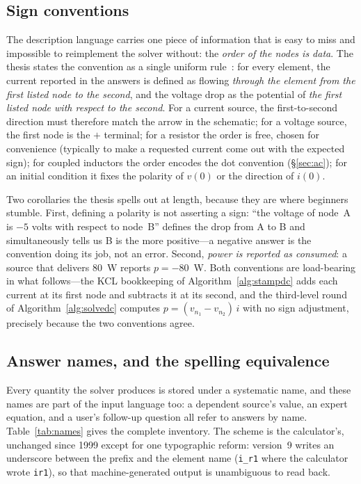 \documentclass[11pt,oneside]{report}
\newcommand{\code}[1]{\texttt{#1}}
\begin{document}
\subsection{Sign conventions}
\label{sec:signs}

The description language carries one piece of information that is
easy to miss and impossible to reimplement the solver without: the
\emph{order of the nodes is data}. The thesis states the convention
as a single uniform rule~\cite[\S2.11.1]{thesis2000}: for every
element, the current reported in the answers is defined as flowing
\emph{through the element from the first listed node to the second},
and the voltage drop as the potential of \emph{the first listed node
with respect to the second}. For a current source, the first-to-second
direction must therefore match the arrow in the schematic; for a
voltage source, the first node is the $+$ terminal; for a resistor
the order is free, chosen for convenience (typically to make a
requested current come out with the expected sign); for coupled
inductors the order encodes the dot convention (\S\ref{sec:ac}); for
an initial condition it fixes the polarity of $v(0)$ or the direction
of $i(0)$.

Two corollaries the thesis spells out at length, because they are
where beginners stumble. First, defining a polarity is not asserting
a sign: ``the voltage of node~A is $-5$ volts with respect to
node~B'' defines the drop from A to B and simultaneously tells us B
is the more positive---a negative answer is the convention doing its
job, not an error. Second, \emph{power is reported as consumed}: a
source that delivers 80~W reports $p = -80$~W. Both conventions are
load-bearing in what follows---the KCL bookkeeping of
Algorithm~\ref{alg:stampdc} adds each current at its first node and
subtracts it at its second, and the third-level round of
Algorithm~\ref{alg:solvedc} computes $p = (v_{n_1}-v_{n_2})\,i$ with
no sign adjustment, precisely because the two conventions agree.

\subsection{Answer names, and the spelling equivalence}
\label{sec:names}

Every quantity the solver produces is stored under a systematic name,
and these names are part of the input language too: a dependent
source's value, an expert equation, and a user's follow-up question
all refer to answers by name. Table~\ref{tab:names} gives the
complete inventory. The scheme is the calculator's, unchanged since
1999 except for one typographic reform: version~9 writes an
underscore between the prefix and the element name (\code{i\_r1}
where the calculator wrote \code{ir1}), so that machine-generated
output is unambiguous to read back.
\end{document}

